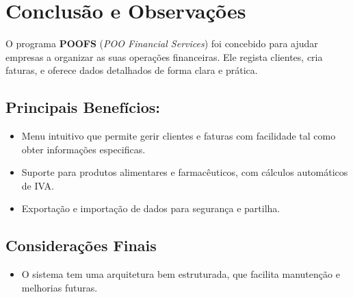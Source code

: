 \documentclass[a4paper, 11pt]{article}
\newcommand\ssection[1]{\section{#1} }
\newcommand\sssection[1]{ \subsection*{\color{MidnightBlue}#1}\vspace{-2ex} }
\begin{document}
\ssection{Conclusão e Observações}

O programa \textbf{POOFS} (\textit{POO Financial Services}) foi concebido para ajudar empresas a organizar as suas operações financeiras. Ele regista clientes, cria faturas, e oferece dados detalhados de forma clara e prática.

\sssection{Principais Benefícios:}
\begin{itemize}
    \setlength\itemsep{0em}
    \item Menu intuitivo que permite gerir clientes e faturas com facilidade tal como obter informações especificas.
    \item Suporte para produtos alimentares e farmacêuticos, com cálculos automáticos de IVA.
    \item Exportação e importação de dados para segurança e partilha.
\end{itemize}

\sssection{Considerações Finais}
\begin{itemize}
    \item O sistema tem uma arquitetura bem estruturada, que facilita manutenção e melhorias futuras.
\end{itemize}



\newpage
\end{document}
